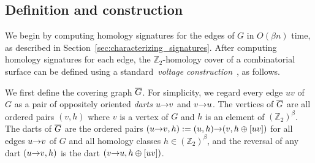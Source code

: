 \documentclass[letterpaper,review]{siamart190516}
\def\arcto{\mathord\shortrightarrow}
\def\arc#1#2{#1\arcto#2}
\def\Z{\mathbb{Z}}
\def\Gbar{\overline{\smash{G}\vphantom{t}}}
\begin{document}
%
%
%
%
%
%
%
%

\subsection{Definition and construction}
\label{sec:homcover_cover}

We begin by computing homology signatures for the edges of $G$ in $O(\beta n)$ time, as described in Section~\ref{sec:characterizing_signatures}.
After computing homology signatures for each edge, the $\Z_2$-homology cover of a combinatorial surface can be defined using a standard~\emph{voltage construction}~\cite[Chapter 4]{gt-tgt-01}, as follows.

We first define the covering graph $\Gbar$.  For simplicity, we regard every edge $uv$ of $G$ as a pair of oppositely oriented \emph{darts} $\arc{u}{v}$ and $\arc{v}{u}$.  The vertices of $\Gbar$ are all ordered pairs $(v, h)$ where $v$ is a vertex of $G$ and $h$ is an element of $(\Z_2)^\beta$.  The darts of $\Gbar$ are the ordered pairs $(\arc{u}{v}, h) := (u, h)\arcto(v, h\oplus [uv])$ for all edges $\arc{u}{v}$ of $G$ and all homology classes $h \in (\Z_2)^\beta$, and the reversal of any dart $(\arc{u}{v}, h)$ is the dart $(\arc{v}{u}, h\oplus[uv])$.
\end{document}
